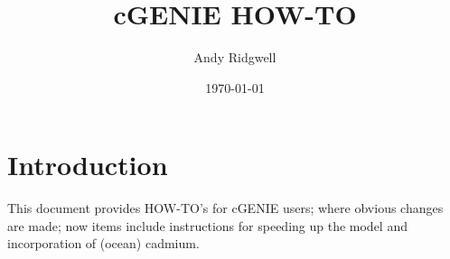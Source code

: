 \documentclass[10pt,twoside]{article}
\title{cGENIE HOW-TO}
\author{Andy Ridgwell}
\date{\today}
\begin{document}

\maketitle



\tableofcontents





\newpage
\section{Introduction}\label{Introduction}

This document provides HOW-TO's for cGENIE users; where obvious changes are made; now items include instructions for speeding up the model and incorporation of (ocean) cadmium.


\end{document}
